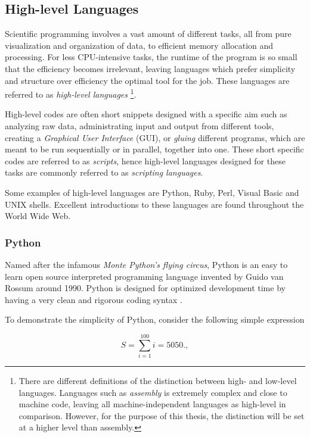 \subsection{High-level Languages}

Scientific programming involves a vast amount of different tasks, all from pure visualization and organization of data, to efficient memory allocation and processing. For less CPU-intensive tasks, the runtime of the program is so small that the efficiency becomes irrelevant, leaving languages which prefer simplicity and structure over efficiency the optimal tool for the job. These languages are referred to as \textit{high-level languages} \footnote{There are different definitions of the distinction between high- and low-level languages. Languages such as \textit{assembly} is extremely complex and close to machine code, leaving all machine-independent languages as high-level in comparison. However, for the purpose of this thesis, the distinction will be set at a higher level than assembly.}.

High-level codes are often short snippets designed with a specific aim such as analyzing raw data, administrating input and output from different tools, creating a \textit{Graphical User Interface} (GUI), or \textit{gluing} different programs, which are meant to be run sequentially or in parallel, together into one. These short specific codes are referred to as \textit{scripts}, hence high-level languages designed for these tasks are commonly referred to as \textit{scripting languages}\cite{inf3331, pythonBook}. 

Some examples of high-level languages are Python, Ruby, Perl, Visual Basic and UNIX shells. Excellent introductions to these languages are found throughout the World Wide Web.

\subsubsection{Python}
\label{sec:Python}

Named after the infamous \textit{Monte Python's flying circus}, Python is an easy to learn open source interpreted programming language invented by Guido van Rossum around 1990. Python is designed for optimized development time by having a very clean and rigorous coding syntax \cite{inf1100, pythonBook}. 

To demonstrate the simplicity of Python, consider the following simple expression

\begin{equation}
 S = \sum_{i=1}^{100} i = 5050.  \label{eq:sum100},
\end{equation}


